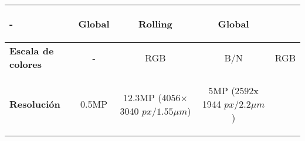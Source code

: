 \begin{savenotes}
\begin{mytable}[H]
\begin{tabular}{l|c|c|c|c|}
\begin{minipage}{\mythirdmaxsizeofcontenttable}
\begin{myflushcenterinsidetable}
					- 
			\end{myflushcenterinsidetable}\end{minipage} & 
			\begin{minipage}{\mythirdmaxsizeofcontenttable}\begin{myflushcenterinsidetable}
					Global
			\end{myflushcenterinsidetable}\end{minipage} &
			\begin{minipage}{\mythirdmaxsizeofcontenttable}\begin{myflushcenterinsidetable}
					Rolling 
			\end{myflushcenterinsidetable}\end{minipage}&
			\begin{minipage}{\mythirdmaxsizeofcontenttable}\begin{myflushcenterinsidetable}
				Global 
			\end{myflushcenterinsidetable}\end{minipage} 			
			\\ \hline
			\multicolumn{1}{|l|}{
				\begin{minipage}{\myforthmaxsizeofcontenttable}	
					\textbf{Escala de colores}
				\end{minipage}
			} & - & RGB & B/N & RGB \\ \hline
			\multicolumn{1}{|l|}{
			\begin{minipage}{\myforthmaxsizeofcontenttable}	
				\textbf{Resolución}
			\end{minipage}
			} & 0.5MP & 
			\begin{minipage}{\mythirdmaxsizeofcontenttable}\begin{myflushcenterinsidetable}
				12.3MP (4056× 3040 $px/1.55{\mu}m$)
			\end{myflushcenterinsidetable}\end{minipage} & 
			\begin{minipage}{\mythirdmaxsizeofcontenttable}\begin{myflushcenterinsidetable}
				5MP (2592x 1944 $px/2.2{\mu}m$)
			\end{myflushcenterinsidetable}\end{minipage} & 

\end{tabular}
\end{mytable}
\end{savenotes}
